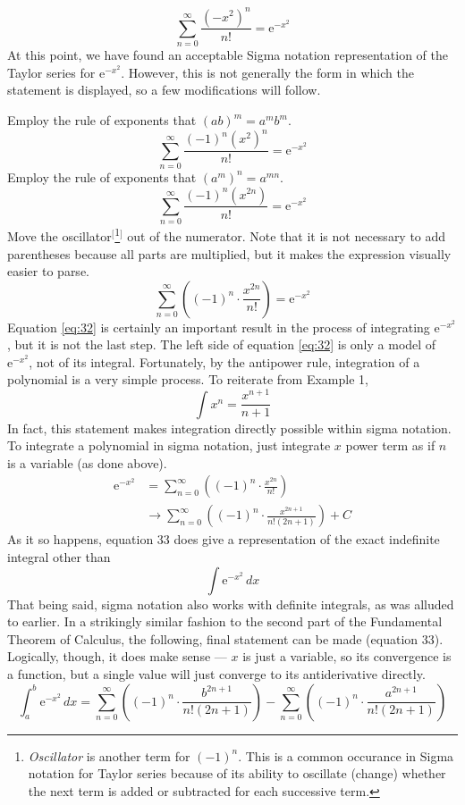 \documentclass{article}
\begin{document}
\begin{equation*}
    \sum_{n=0}^\infty \frac{(-x^2)^n}{n!} = \text{e}^{-x^2}
\end{equation*}
At this point, we have found an acceptable Sigma notation representation of the Taylor series for $\text{e}^{-x^2}$. However, this is not generally the form in which the statement is displayed, so a few modifications will follow.\par
Employ the rule of exponents that $(ab)^m=a^mb^m$.
\begin{equation*}
    \sum_{n=0}^\infty \frac{(-1)^n(x^2)^n}{n!} = \text{e}^{-x^2}
\end{equation*}
Employ the rule of exponents that $(a^m)^n=a^{mn}$.
\begin{equation*}
    \sum_{n=0}^\infty \frac{(-1)^n(x^{2n})}{n!} = \text{e}^{-x^2}
\end{equation*}
Move the oscillator$^[$\footnote{\emph{Oscillator} is another term for $(-1)^n$. This is a common occurance in Sigma notation for Taylor series because of its ability to oscillate (change) whether the next term is added or subtracted for each successive term.}$^]$ out of the numerator. Note that it is not necessary to add parentheses because all parts are multiplied, but it makes the expression visually easier to parse.
\begin{equation} \label{eq:32}
    \sum_{n=0}^\infty \left((-1)^n\cdot\frac{x^{2n}}{n!}\right) = \text{e}^{-x^2}
\end{equation}
Equation \ref{eq:32} is certainly an important result in the process of integrating $\text{e}^{-x^2}$, but it is not the last step. The left side of equation \ref{eq:32} is only a model of $\text{e}^{-x^2}$, not of its integral. Fortunately, by the antipower rule, integration of a polynomial is a very simple process. To reiterate from Example 1,
\begin{equation*}
    \int x^n = \frac{x^{n+1}}{n+1}
\end{equation*}
In fact, this statement makes integration directly possible within sigma notation. To integrate a polynomial in sigma notation, just integrate $x$ power term as if $n$ is a variable (as done above).
\begin{align*}
    \text{e}^{-x^2} &= \sum_{n=0}^\infty \left((-1)^n\cdot\frac{x^{2n}}{n!}\right)\\
    &\rightarrow \sum_{n=0}^\infty \left((-1)^n\cdot\frac{x^{2n+1}}{n!(2n+1)}\right)+C\tag{33}
\end{align*}
As it so happens, equation 33 does give a representation of the exact indefinite integral other than$$\int \text{e}^{-x^2}\, dx$$That being said, sigma notation also works with definite integrals, as was alluded to earlier. In a strikingly similar fashion to the second part of the Fundamental Theorem of Calculus, the following, final statement can be made (equation 33). Logically, though, it does make sense --- $x$ is just a variable, so its convergence is a function, but a single value will just converge to its antiderivative directly.
\begin{equation}
    \int_a^b \text{e}^{-x^2}\, dx = \sum_{n=0}^\infty \left((-1)^n\cdot\frac{b^{2n+1}}{n!(2n+1)}\right)-\sum_{n=0}^\infty \left((-1)^n\cdot\frac{a^{2n+1}}{n!(2n+1)}\right)
\end{equation}
\end{document}
